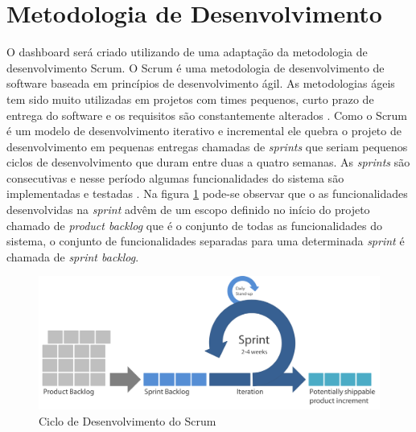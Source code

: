 \section{Metodologia de Desenvolvimento}
\label{met_desenvolvimento}
O dashboard será criado utilizando de uma adaptação da metodologia de desenvolvimento Scrum. O Scrum é uma metodologia de desenvolvimento de software baseada em princípios de desenvolvimento ágil. As metodologias ágeis tem sido muito utilizadas em projetos 	com times pequenos, curto prazo de entrega do software e os requisitos são constantemente alterados \cite{lopez-martinez_problems_2016}. Como o Scrum é um modelo de desenvolvimento iterativo e incremental ele quebra o projeto de desenvolvimento em pequenas entregas chamadas de \textit{sprints} que seriam 	pequenos ciclos de desenvolvimento que duram entre duas a quatro semanas. As \textit{sprints} são consecutivas e nesse período algumas funcionalidades do sistema são implementadas e testadas \cite{pagotto_scrum_2016}. Na figura \ref{img:scrum} pode-se observar que o as funcionalidades desenvolvidas na \textit{sprint} advêm de um escopo definido no início do projeto chamado de \textit{product backlog} que é o conjunto de todas as funcionalidades do sistema, o conjunto de funcionalidades separadas para uma determinada \textit{sprint} é chamada de \textit{sprint backlog}\cite{sabbagh_scrum:_2014}.
\graphicspath{{figuras/}}
\begin{figure}[h]
\centering
\includegraphics[scale=0.40]{scrum}
\caption{Ciclo de Desenvolvimento do Scrum}
\label{img:scrum}
\end{figure}

